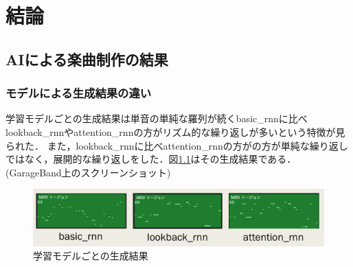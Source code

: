 \chapter{結論}
\section{AIによる楽曲制作の結果}
\subsection{モデルによる生成結果の違い}
学習モデルごとの生成結果は単音の単純な羅列が続くbasic\_rnnに比べlookback\_rnnやattention\_rnnの方がリズム的な繰り返しが多いという特徴が見られた．
また，lookback\_rnnに比べattention\_rnnの方がの方が単純な繰り返しではなく，展開的な繰り返しをした．図\ref{fig:学習モデルごとの生成結果}はその生成結果である．(GarageBand上のスクリーンショット)
\begin{figure}[h]
    \begin{screen}
    \begin{center}
        \includegraphics[scale=0.68, clip]{./img/model.png}
        \caption{学習モデルごとの生成結果}
        \label{fig:学習モデルごとの生成結果}
    \end{center}
    \end{screen}
\end{figure}
\newpage
